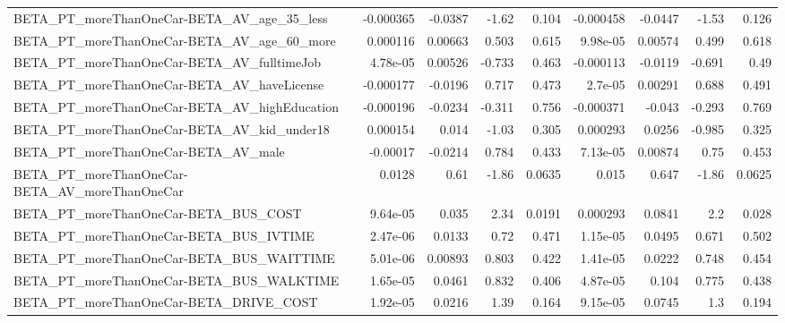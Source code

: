 \begin{tabular}{lrrrrrrrr}
BETA\_PT\_moreThanOneCar-BETA\_AV\_age\_35\_less         &   -0.000365 &      -0.0387 &     -1.62 &    0.104 &  -0.000458 &     -0.0447 &        -1.53 &         0.126 \\
BETA\_PT\_moreThanOneCar-BETA\_AV\_age\_60\_more         &    0.000116 &      0.00663 &     0.503 &    0.615 &   9.98e-05 &     0.00574 &        0.499 &         0.618 \\
BETA\_PT\_moreThanOneCar-BETA\_AV\_fulltimeJob         &    4.78e-05 &      0.00526 &    -0.733 &    0.463 &  -0.000113 &     -0.0119 &       -0.691 &          0.49 \\
BETA\_PT\_moreThanOneCar-BETA\_AV\_haveLicense         &   -0.000177 &      -0.0196 &     0.717 &    0.473 &    2.7e-05 &     0.00291 &        0.688 &         0.491 \\
BETA\_PT\_moreThanOneCar-BETA\_AV\_highEducation       &   -0.000196 &      -0.0234 &    -0.311 &    0.756 &  -0.000371 &      -0.043 &       -0.293 &         0.769 \\
BETA\_PT\_moreThanOneCar-BETA\_AV\_kid\_under18         &    0.000154 &        0.014 &     -1.03 &    0.305 &   0.000293 &      0.0256 &       -0.985 &         0.325 \\
BETA\_PT\_moreThanOneCar-BETA\_AV\_male                &    -0.00017 &      -0.0214 &     0.784 &    0.433 &   7.13e-05 &     0.00874 &         0.75 &         0.453 \\
BETA\_PT\_moreThanOneCar-BETA\_AV\_moreThanOneCar      &      0.0128 &         0.61 &     -1.86 &   0.0635 &      0.015 &       0.647 &        -1.86 &        0.0625 \\
BETA\_PT\_moreThanOneCar-BETA\_BUS\_COST               &    9.64e-05 &        0.035 &      2.34 &   0.0191 &   0.000293 &      0.0841 &          2.2 &         0.028 \\
BETA\_PT\_moreThanOneCar-BETA\_BUS\_IVTIME             &    2.47e-06 &       0.0133 &      0.72 &    0.471 &   1.15e-05 &      0.0495 &        0.671 &         0.502 \\
BETA\_PT\_moreThanOneCar-BETA\_BUS\_WAITTIME           &    5.01e-06 &      0.00893 &     0.803 &    0.422 &   1.41e-05 &      0.0222 &        0.748 &         0.454 \\
BETA\_PT\_moreThanOneCar-BETA\_BUS\_WALKTIME           &    1.65e-05 &       0.0461 &     0.832 &    0.406 &   4.87e-05 &       0.104 &        0.775 &         0.438 \\
BETA\_PT\_moreThanOneCar-BETA\_DRIVE\_COST             &    1.92e-05 &       0.0216 &      1.39 &    0.164 &   9.15e-05 &      0.0745 &          1.3 &         0.194 \\

\end{tabular}
